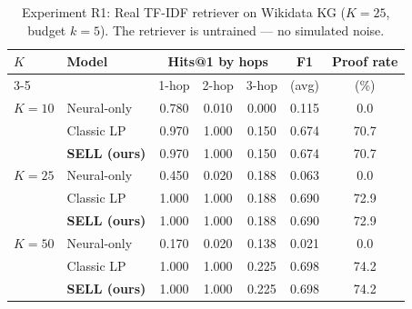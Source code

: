 \begin{table}[t]
\centering
\caption{Experiment R1: Real TF-IDF retriever on Wikidata KG ($K{=}25$, budget $k{=}5$). The retriever is untrained --- no simulated noise.}
\label{tab:real_retriever}
\small
\begin{tabular}{llccccc}
\toprule
$K$ & Model & \multicolumn{3}{c}{Hits@1 by hops} & F1 & Proof rate \\
\cmidrule(lr){3-5}
 & & 1-hop & 2-hop & 3-hop & (avg) & (\%) \\
\midrule
 $K{=}10$ & Neural-only & 0.780 & 0.010 & 0.000 & 0.115 & 0.0 \\
  & Classic LP & 0.970 & 1.000 & 0.150 & 0.674 & 70.7 \\
  & \textbf{SELL (ours)} & 0.970 & 1.000 & 0.150 & 0.674 & 70.7 \\
\midrule
 $K{=}25$ & Neural-only & 0.450 & 0.020 & 0.188 & 0.063 & 0.0 \\
  & Classic LP & 1.000 & 1.000 & 0.188 & 0.690 & 72.9 \\
  & \textbf{SELL (ours)} & 1.000 & 1.000 & 0.188 & 0.690 & 72.9 \\
\midrule
 $K{=}50$ & Neural-only & 0.170 & 0.020 & 0.138 & 0.021 & 0.0 \\
  & Classic LP & 1.000 & 1.000 & 0.225 & 0.698 & 74.2 \\
  & \textbf{SELL (ours)} & 1.000 & 1.000 & 0.225 & 0.698 & 74.2 \\
\bottomrule
\end{tabular}
\end{table}